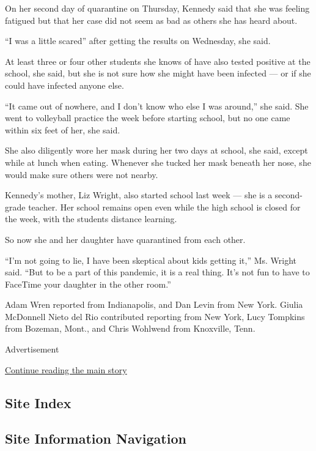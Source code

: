 On her second day of quarantine on Thursday, Kennedy said that she was
feeling fatigued but that her case did not seem as bad as others she has
heard about.

``I was a little scared'' after getting the results on Wednesday, she
said.

At least three or four other students she knows of have also tested
positive at the school, she said, but she is not sure how she might have
been infected --- or if she could have infected anyone else.

``It came out of nowhere, and I don't know who else I was around,'' she
said. She went to volleyball practice the week before starting school,
but no one came within six feet of her, she said.

She also diligently wore her mask during her two days at school, she
said, except while at lunch when eating. Whenever she tucked her mask
beneath her nose, she would make sure others were not nearby.

Kennedy's mother, Liz Wright, also started school last week --- she is a
second-grade teacher. Her school remains open even while the high school
is closed for the week, with the students distance learning.

So now she and her daughter have quarantined from each other.

``I'm not going to lie, I have been skeptical about kids getting it,''
Ms. Wright said. ``But to be a part of this pandemic, it is a real
thing. It's not fun to have to FaceTime your daughter in the other
room.''

Adam Wren reported from Indianapolis, and Dan Levin from New York.
Giulia McDonnell Nieto del Rio contributed reporting from New York, Lucy
Tompkins from Bozeman, Mont., and Chris Wohlwend from Knoxville, Tenn.

Advertisement

\protect\hyperlink{after-bottom}{Continue reading the main story}

\hypertarget{site-index}{%
\subsection{Site Index}\label{site-index}}

\hypertarget{site-information-navigation}{%
\subsection{Site Information
Navigation}\label{site-information-navigation}}

